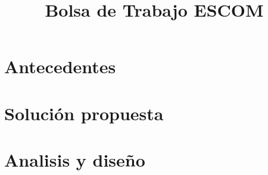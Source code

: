 \documentclass[11pt, twopages]{book}
\date{}
\title{Bolsa de Trabajo ESCOM}
\author{}
\begin{document}
    \frontmatter
        \maketitle
        \tableofcontents
    \mainmatter
    


    \chapter{Antecedentes}
        \label{aloneparts:antecedentes}
        

    \chapter{Solución propuesta}
        \label{aloneparts:propuesta}
        
    
    \chapter{Analisis y diseño}
        
    
        
    \appendix

        
        
        
        
        
        
   
\end{document}
